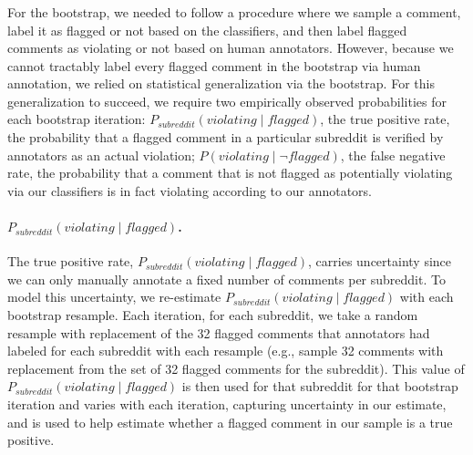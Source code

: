 \subsubsection{}
For the bootstrap, we needed to follow a procedure where we sample a comment, label it as flagged or not based on the classifiers, and then label flagged comments as violating or not based on human annotators. However, because we cannot tractably label every flagged comment in the bootstrap via human annotation, we relied on statistical generalization via the bootstrap. For this generalization to succeed, we require two empirically observed probabilities for each bootstrap iteration: $P_{subreddit}(violating \mid flagged)$, the true positive rate, the probability that a flagged comment in a particular subreddit is verified by annotators as an actual violation; $P(violating \mid \lnot flagged)$, the false negative rate, the probability that a comment that is not flagged as potentially violating via our classifiers is in fact violating according to our annotators.

\paragraph{$P_{subreddit}(violating \mid flagged)$.} The true positive rate, $P_{subreddit}(violating \mid flagged)$, carries uncertainty since we can only manually annotate a fixed number of comments per subreddit. To model this uncertainty, we re-estimate $P_{subreddit}(violating \mid flagged)$ with each bootstrap resample. Each iteration, for each subreddit, we take a random resample with replacement of the 32 flagged comments that annotators had labeled for each subreddit with each resample (e.g., sample 32 comments with replacement from the set of 32 flagged comments for the subreddit). This value of $P_{subreddit}(violating \mid flagged)$ is then used for that subreddit for that bootstrap iteration and varies with each iteration, capturing uncertainty in our estimate, and is used to help estimate whether a flagged comment in our sample is a true positive.

